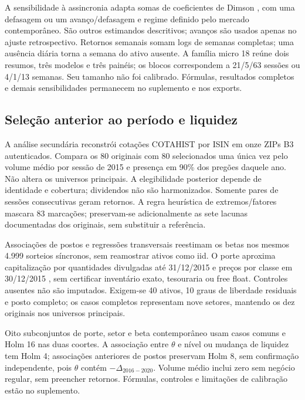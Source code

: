 A sensibilidade à assincronia adapta somas de coeficientes de Dimson
\cite{dimson1979}, com uma defasagem ou um avanço/defasagem e regime
definido pelo mercado contemporâneo. São outros estimandos descritivos;
avanços são usados apenas no ajuste retrospectivo. Retornos semanais
somam logs de semanas completas; uma ausência diária torna a semana
do ativo ausente. A família micro 18 reúne dois resumos, três modelos
e três painéis; os blocos correspondem a 21/5/63 sessões ou 4/1/13 semanas.
Seu tamanho não foi calibrado. Fórmulas, resultados completos e demais
sensibilidades permanecem no suplemento e nos exports.


\subsection{Seleção anterior ao período e liquidez}
A análise secundária reconstrói cotações COTAHIST por ISIN em onze ZIPs
B3 autenticados. Compara os 80 originais com 80 selecionados uma única
vez pelo volume médio por sessão de 2015 e presença em 90\% dos pregões
daquele ano. Não altera os universos principais. A elegibilidade posterior
depende de identidade e cobertura; dividendos não são harmonizados.
Somente pares de sessões consecutivas geram retornos. A regra heurística
de extremos/fatores mascara 83 marcações; preservam-se adicionalmente
as sete lacunas documentadas dos originais, sem substituir a referência.

Associações de postos e regressões transversais reestimam os betas nos
mesmos 4.999 sorteios síncronos, sem reamostrar ativos como iid.
O porte aproxima capitalização por quantidades divulgadas até 31/12/2015
e preços por classe em 30/12/2015 \cite{cvmfre}, sem certificar inventário
exato, tesouraria ou free float. Controles ausentes não são imputados.
Exigem-se 40 ativos, 10 graus de liberdade residuais e posto completo;
os casos completos representam nove setores, mantendo os dez originais
nos universos principais.

Oito subconjuntos de porte, setor e beta contemporâneo usam casos comuns
e Holm 16 nas duas coortes. A associação entre $\theta$ e nível ou mudança
de liquidez tem Holm 4; associações anteriores de postos preservam Holm 8,
sem confirmação independente, pois $\theta$ contém $-\Delta_{2016-2020}$.
Volume médio inclui zero sem negócio regular, sem preencher retornos.
Fórmulas, controles e limitações de calibração estão no suplemento.

